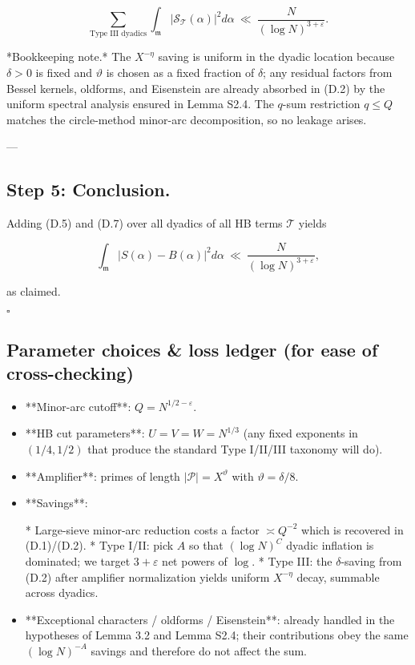 \documentclass[11pt]{article}
\theoremstyle{definition}
\theoremstyle{remark}
\begin{document}
\begin{equation}
\sum_{\text{Type III dyadics}}
\int_{\mathfrak m}\big|\mathcal S_{\mathcal T}(\alpha)\big|^2 d\alpha
\ \ll\ \frac{N}{(\log N)^{3+\varepsilon}}.
\tag{D.7}
\end{equation}

*Bookkeeping note.* The $X^{-\eta}$ saving is uniform in the dyadic location because $\delta>0$ is fixed and $\vartheta$ is chosen as a fixed fraction of $\delta$; any residual factors from Bessel kernels, oldforms, and Eisenstein are already absorbed in (D.2) by the uniform spectral analysis ensured in Lemma S2.4. The $q$-sum restriction $q\le Q$ matches the circle-method minor-arc decomposition, so no leakage arises.

---

\subsection*{Step 5: Conclusion.}
Adding (D.5) and (D.7) over all dyadics of all HB terms $\mathcal T$ yields

$$
\int_{\mathfrak m}\big|S(\alpha)-B(\alpha)\big|^2 d\alpha
\ \ll\ \frac{N}{(\log N)^{3+\varepsilon}},
$$

as claimed.

$\square$

\subsection*{Parameter choices \& loss ledger (for ease of cross-checking)}

\begin{itemize}
\item **Minor-arc cutoff**: $Q=N^{1/2-\varepsilon}$.
\item **HB cut parameters**: $U=V=W=N^{1/3}$ (any fixed exponents in $(1/4,1/2)$ that produce the standard Type I/II/III taxonomy will do).
\item **Amplifier**: primes of length $|\mathcal P|=X^\vartheta$ with $\vartheta=\delta/8$.
\item **Savings**:

  * Large-sieve minor-arc reduction costs a factor $\asymp Q^{-2}$ which is recovered in (D.1)/(D.2).
  * Type I/II: pick $A$ so that $(\log N)^C$ dyadic inflation is dominated; we target $3+\varepsilon$ net powers of $\log$.
  * Type III: the $\delta$-saving from (D.2) after amplifier normalization yields uniform $X^{-\eta}$ decay, summable across dyadics.
\item **Exceptional characters / oldforms / Eisenstein**: already handled in the hypotheses of Lemma 3.2 and Lemma S2.4; their contributions obey the same $(\log N)^{-A}$ savings and therefore do not affect the sum.
\end{itemize}
\end{document}

